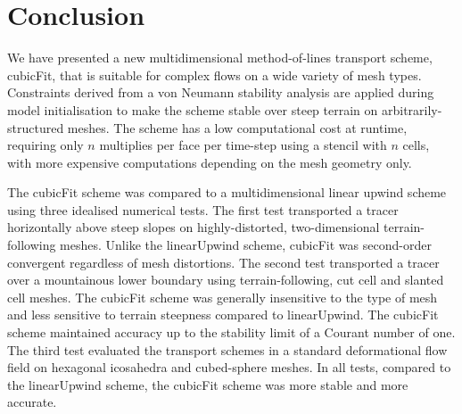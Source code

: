 \section{Conclusion}
\label{sec:conclusion}

We have presented a new multidimensional method-of-lines transport scheme, cubicFit, that is suitable for complex flows on a wide variety of mesh types.  Constraints derived from a von Neumann stability analysis are applied during model initialisation to make the scheme stable over steep terrain on arbitrarily-structured meshes.
The scheme has a low computational cost at runtime, requiring only $n$ multiplies per face per time-step using a stencil with $n$ cells, with more expensive computations depending on the mesh geometry only.

The cubicFit scheme was compared to a multidimensional linear upwind scheme using three idealised numerical tests.
The first test transported a tracer horizontally above steep slopes on highly-distorted, two-dimensional terrain-following meshes.  Unlike the linearUpwind scheme, cubicFit was second-order convergent regardless of mesh distortions.
The second test transported a tracer over a mountainous lower boundary using terrain-following, cut cell and slanted cell meshes.
The cubicFit scheme was generally insensitive to the type of mesh and less sensitive to terrain steepness compared to linearUpwind.  The cubicFit scheme maintained accuracy up to the stability limit of a Courant number of one.
The third test evaluated the transport schemes in a standard deformational flow field on hexagonal icosahedra and cubed-sphere meshes.
In all tests, compared to the linearUpwind scheme, the cubicFit scheme was more stable and more accurate.

